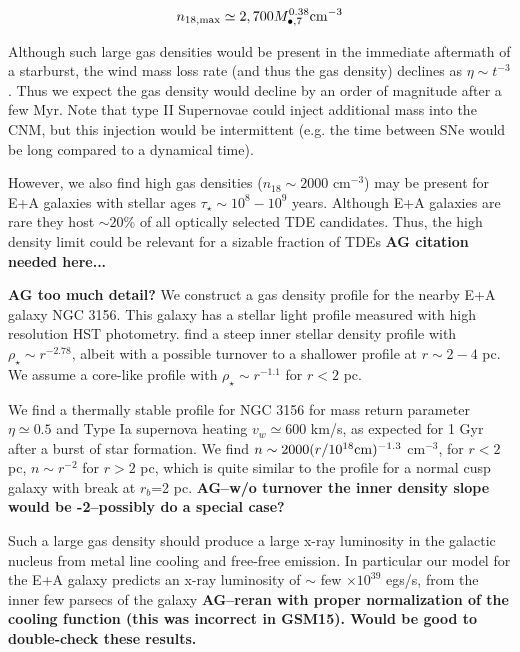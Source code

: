 \documentclass[usenatbib,fleqn]{mn2e}
\newcommand{\Mbh}[1][]{M_{\bullet#1}}
\begin{document}
\begin{equation}
n_{\rm 18,max} \simeq 2,700 \Mbh[,7]^{0.38} {\rm cm^{-3}}
\label{eq:n18max}
\end{equation}

Although such large gas densities would be present in the immediate
aftermath of a starburst, the wind mass loss rate (and thus the gas
density) declines as $\eta \sim t^{-3}$. Thus we expect the gas density would
decline by an order of magnitude after a few Myr. Note that type II
Supernovae could inject additional mass into the CNM, but this
injection would be intermittent (e.g. the time between SNe would be
long compared to a dynamical time).

However, we also find high gas densities ($n_{18}\sim 2000$ cm$^{-3}$)
may be present for E+A galaxies with stellar ages $\tau_\star\sim
10^8-10^9$ years. Although E+A galaxies are rare they host $\sim 20
\%$ of all optically selected TDE candidates. Thus, the high density
limit could be relevant for a sizable fraction of TDEs {\bf AG citation
  needed here...}

{\bf AG too much detail?} We construct a gas density profile for the
nearby E+A galaxy NGC 3156. This galaxy has a stellar light profile
measured with high resolution HST photometry. \citealt{Krajnovic+2013}
find a steep inner stellar density profile with $\rho_\star\sim
r^{-2.78}$, albeit with a possible turnover to a shallower profile at
$r \sim 2-4$ pc. We assume a core-like profile with $\rho_\star \sim
r^{-1.1}$ for $r<2$ pc.

We find a thermally stable profile for NGC 3156 for mass
return parameter $\eta\simeq0.5$ and Type Ia supernova heating
$v_w\simeq600 $ km/s, as expected for 1 Gyr after a burst of star
formation. We find $n \sim 2000 (r/10^{18} {\rm cm})^{-1.3}$
cm$^{-3}$, for $r<2$ pc, $n\sim r^{-2}$ for $r>2$ pc, which is quite
similar to the profile for a normal cusp galaxy with break at $r_b$=2
pc. {\bf AG--w/o turnover the inner density slope would be -2--possibly
do a special case?}

Such a large gas density should produce a large x-ray luminosity in
the galactic nucleus from metal line cooling and free-free emission.
In particular our model for the E+A galaxy predicts an x-ray
luminosity of $\sim$ few $\times 10^{39}$ egs/s, from the inner few
parsecs of the galaxy {\bf AG--reran with proper normalization of the
  cooling function (this was incorrect in GSM15). Would be good to
  double-check these results.}
\end{document}
